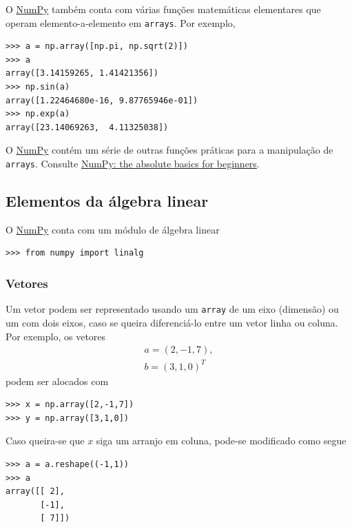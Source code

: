 \documentclass[12pt]{article}
\begin{document}
O \href{https://numpy.org/}{NumPy} também conta com várias funções matemáticas elementares que operam elemento-a-elemento em \lstinline+arrays+. Por exemplo,

\begin{lstlisting}
>>> a = np.array([np.pi, np.sqrt(2)])
>>> a
array([3.14159265, 1.41421356])
>>> np.sin(a)
array([1.22464680e-16, 9.87765946e-01])
>>> np.exp(a)
array([23.14069263,  4.11325038])
\end{lstlisting}
 
\begin{obs}
O \href{https://numpy.org/}{NumPy} contém um série de outras funções práticas para a manipulação de \lstinline+arrays+. Consulte \href{https://numpy.org/doc/stable/user/absolute_beginners.html\#numpy-the-absolute-basics-for-beginners}{NumPy: the absolute basics for beginners}.  
\end{obs}

\subsection{Elementos da álgebra linear}

O \href{https://numpy.org/}{NumPy} conta com um módulo de álgebra linear

\begin{lstlisting}
>>> from numpy import linalg
\end{lstlisting}

\subsubsection{Vetores}

Um vetor podem ser representado usando um \lstinline+array+ de um eixo (dimensão) ou um com dois eixos, caso se queira diferenciá-lo entre um vetor linha ou coluna. Por exemplo, os vetores
\begin{gather}
  a = (2, -1, 7),\\
  b = (3, 1, 0)^T
\end{gather}
podem ser alocados com

\begin{lstlisting}
>>> x = np.array([2,-1,7])
>>> y = np.array([3,1,0])
\end{lstlisting}

Caso queira-se que $x$ siga um arranjo em coluna, pode-se modificado como segue

\begin{lstlisting}
>>> a = a.reshape((-1,1))
>>> a
array([[ 2],
       [-1],
       [ 7]])
\end{lstlisting}
\end{document}
